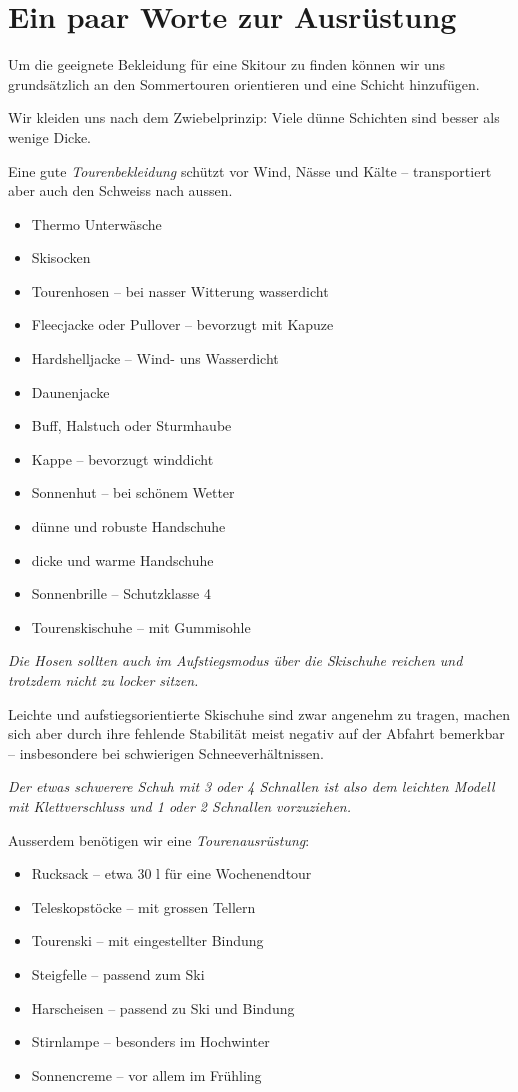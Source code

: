 \section{Ein paar Worte zur Ausrüstung}

Um die geeignete Bekleidung für eine Skitour zu finden können wir uns grundsätzlich an den Sommertouren orientieren und eine Schicht hinzufügen.

Wir kleiden uns nach dem Zwiebelprinzip: Viele dünne Schichten sind besser als wenige Dicke.

Eine gute \textit{Tourenbekleidung} schützt vor Wind, Nässe und Kälte -- transportiert aber auch den Schweiss nach aussen.

\begin{itemize}
  \item{Thermo Unterwäsche}
  \item{Skisocken}
  \item{Tourenhosen -- bei nasser Witterung wasserdicht}
  \item{Fleecjacke oder Pullover -- bevorzugt mit Kapuze}
  \item{Hardshelljacke -- Wind- uns Wasserdicht}
  \item{Daunenjacke}
  \item{Buff, Halstuch oder Sturmhaube}
  \item{Kappe -- bevorzugt winddicht}
  \item{Sonnenhut -- bei schönem Wetter}
  \item{dünne und robuste Handschuhe}
  \item{dicke und warme Handschuhe}
  \item{Sonnenbrille -- Schutzklasse 4}
  \item{Tourenskischuhe -- mit Gummisohle}
\end{itemize}

\textit{Die Hosen sollten auch im Aufstiegsmodus über die Skischuhe reichen und trotzdem nicht zu locker sitzen.}

Leichte und aufstiegsorientierte Skischuhe sind zwar angenehm zu tragen, machen sich aber durch ihre fehlende Stabilität meist negativ auf der Abfahrt bemerkbar -- insbesondere bei schwierigen Schneeverhältnissen.

\textit{Der etwas schwerere Schuh mit 3 oder 4 Schnallen ist also dem leichten Modell mit Klettverschluss und 1 oder 2 Schnallen vorzuziehen.}

Ausserdem benötigen wir eine \textit{Tourenausrüstung}:

\begin{itemize}
  \item{Rucksack -- etwa 30 l für eine Wochenendtour}
  \item{Teleskopstöcke -- mit grossen Tellern}
  \item{Tourenski -- mit eingestellter Bindung}
  \item{Steigfelle -- passend zum Ski}
  \item{Harscheisen -- passend zu Ski und Bindung}
  \item{Stirnlampe -- besonders im Hochwinter}
  \item{Sonnencreme -- vor allem im Frühling}
\end{itemize}

